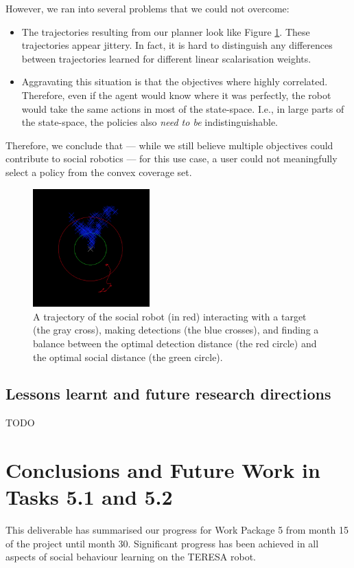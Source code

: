 \documentclass[a4paper,11pt]{report}
\begin{document}
However, we ran into several problems that we could not overcome: 
\begin{itemize}
\item The trajectories resulting from our planner look like Figure \ref{fig:motraj}. These trajectories appear jittery. In fact, it is hard to distinguish any differences between trajectories learned for different linear scalarisation weights. 
\item Aggravating this situation is that the objectives where highly correlated. Therefore, even if the agent would know where it was perfectly, the robot would take the same actions in most of the state-space. I.e., in large parts of the state-space, the policies also \emph{need to be} indistinguishable. 
\end{itemize}
Therefore, we conclude that --- while we still believe multiple objectives could contribute to social robotics --- for this use case, a user could not meaningfully select a policy from the convex coverage set. 
\begin{figure}
\centering
\includegraphics[width=0.4\textwidth]{motrajectory.png}
\caption{A trajectory of the social robot (in red) interacting with a target (the gray 
cross), making detections (the blue crosses), and finding a balance between the optimal 
detection distance (the red circle) and the optimal social distance (the green circle).}
\label{fig:motraj}
\end{figure}

\subsection{Lessons learnt and future research directions}
TODO



\section{Conclusions and Future Work in Tasks 5.1 and 5.2}
\label{sec:conclusions}
This deliverable has summarised our progress for Work Package 5 from month 15 of the project until month 30. Significant progress has been achieved in all aspects of social behaviour learning on the TERESA robot. 
\end{document}
